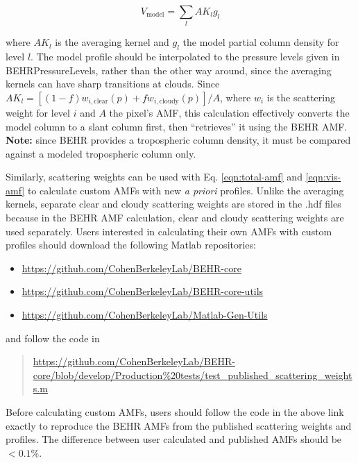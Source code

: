 \documentclass[12pt]{article}
\begin{document}
	\begin{equation}
	V_{\mathrm{model}} = \sum_l AK_l g_l
	\end{equation}
	
	where $AK_l$ is the averaging kernel and $g_l$ the model  partial column density for level $l$. The model profile should be interpolated to the pressure levels given in BEHRPressureLevels, rather than the other way around, since the averaging kernels can have sharp transitions at clouds. Since $AK_l = [(1-f)w_{i,\mathrm{clear}}(p) + f w_{i,\mathrm{cloudy}}(p)]/A$, where $w_i$ is the scattering weight for level $i$ and $A$ the pixel's AMF, this calculation effectively converts the model column to a slant column first, then ``retrieves'' it using the BEHR AMF. \textbf{Note:} since BEHR provides a tropospheric  column density, it must be compared against a modeled tropospheric column only.
	
	Similarly, scattering weights can be used with Eq. \eqref{eqn:total-amf} and \eqref{eqn:vis-amf} to calculate custom AMFs with new \emph{a priori} profiles. Unlike the averaging kernels, separate clear and cloudy scattering weights are stored in the .hdf files because in the BEHR AMF calculation, clear and cloudy scattering weights are used separately.	Users interested in calculating their own AMFs with custom  profiles should download the following Matlab repositories:
	
	\begin{itemize}
	\item \url{https://github.com/CohenBerkeleyLab/BEHR-core}
	\item \url{https://github.com/CohenBerkeleyLab/BEHR-core-utils}
	\item \url{https://github.com/CohenBerkeleyLab/Matlab-Gen-Utils}
	\end{itemize}
	
	and follow the code in
	
	\begin{quote}
	\url{https://github.com/CohenBerkeleyLab/BEHR-core/blob/develop/Production%20tests/test_published_scattering_weights.m}
	\end{quote}
	
	Before calculating custom AMFs, users should follow the code in the above link exactly to reproduce the BEHR AMFs from the published scattering weights and  profiles. The difference between user calculated and published AMFs should be $< 0.1\%$.
	
	
\end{document}
